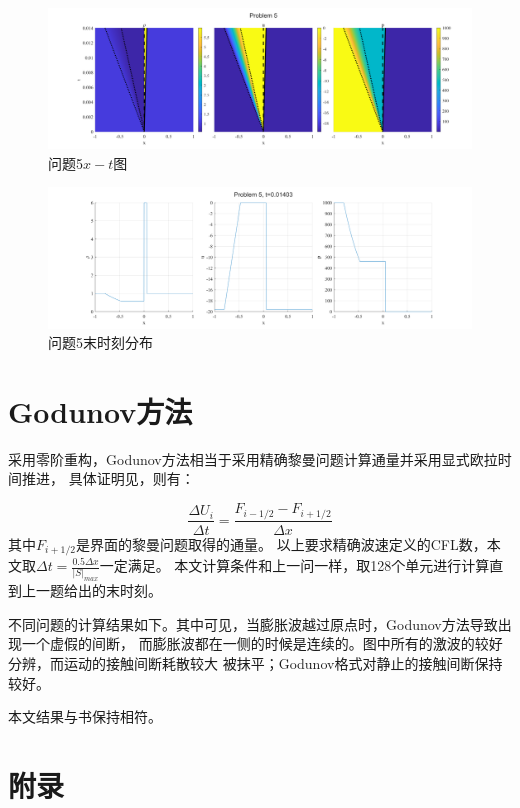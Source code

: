 \documentclass[UTF8,zihao=5]{ctexart} %
\newcommand*{\inc}[0]{{\Delta}}
\begin{document}
\begin{figure}[H]
    \centering
    \includegraphics[width=18cm]{p5.png}  %
    \caption{问题5$x-t$图}
    \label{fig:5a}
\end{figure}

\begin{figure}[H]
    \centering
    \includegraphics[width=18cm]{p5_l.png}  %
    \caption{问题5末时刻分布}
    \label{fig:5b}
\end{figure}

\section{Godunov方法}

采用零阶重构，Godunov方法相当于采用精确黎曼问题计算通量并采用显式欧拉时间推进，
具体证明见\cite{2013Riemann}，则有：

$$
    \frac{\inc U_i}{\inc t} = \frac{F_{i-1/2}-F_{i+1/2}}{\inc x}
$$
其中$F_{i+1/2}$是界面的黎曼问题取得的通量。
以上要求精确波速定义的CFL数，本文取$\inc t = \frac{0.5\inc x}{|S|_{max}}$一定满足。
本文计算条件和上一问一样，取128个单元进行计算直到上一题给出的末时刻。

不同问题的计算结果如下。其中可见，当膨胀波越过原点时，Godunov方法导致出现一个虚假的间断，
而膨胀波都在一侧的时候是连续的。图中所有的激波的较好分辨，而运动的接触间断耗散较大
被抹平；Godunov格式对静止的接触间断保持较好。

本文结果与书\cite{2013Riemann}保持相符。


{}



\section*{附录}
\end{document}
